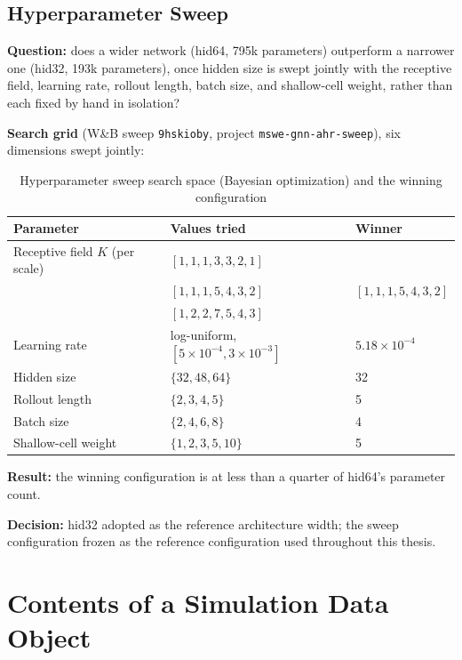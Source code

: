 \documentclass[12pt,a4paper]{report}
\begin{document}
{\section{Hyperparameter Sweep}
\label{app:hp_sweep}

\textbf{Question:} does a wider network (hid64, 795k parameters) outperform a
narrower one (hid32, 193k parameters), once hidden size is swept jointly with
the receptive field, learning rate, rollout length, batch size, and shallow-cell
weight, rather than each fixed by hand in isolation?

\textbf{Search grid} (W\&B sweep \texttt{9hskioby}, project
\texttt{mswe-gnn-ahr-sweep}), six dimensions swept jointly:

\begin{table}[H]
    \centering
    \caption{Hyperparameter sweep search space (Bayesian optimization) and the
      winning configuration}
    \label{tab:app-hp-sweep-grid}
    \begin{tabular}{lll}
        \toprule
        Parameter & Values tried & Winner \\
        \midrule
        Receptive field $K$ (per scale) & $[1,1,1,3,3,2,1]$ & \\
                                         & $[1,1,1,5,4,3,2]$ & $[1,1,1,5,4,3,2]$ \\
                                         & $[1,2,2,7,5,4,3]$ & \\
        Learning rate & log-uniform, $[5\times10^{-4}, 3\times10^{-3}]$ & $5.18\times10^{-4}$ \\
        Hidden size  & $\{32, 48, 64\}$ & 32 \\
        Rollout length  & $\{2, 3, 4, 5\}$ & 5 \\
        Batch size & $\{2, 4, 6, 8\}$ & 4 \\
        Shallow-cell weight  & $\{1, 2, 3, 5, 10\}$ & 5 \\
        \bottomrule
    \end{tabular}
\end{table}

\textbf{Result:} the winning configuration is at less than a quarter of
hid64's parameter count.

\textbf{Decision:} hid32 adopted as the reference architecture width; the sweep
configuration frozen as the reference configuration used throughout this thesis.

\chapter{Contents of a Simulation Data Object}
\label{app:sim_data}

}
\end{document}

